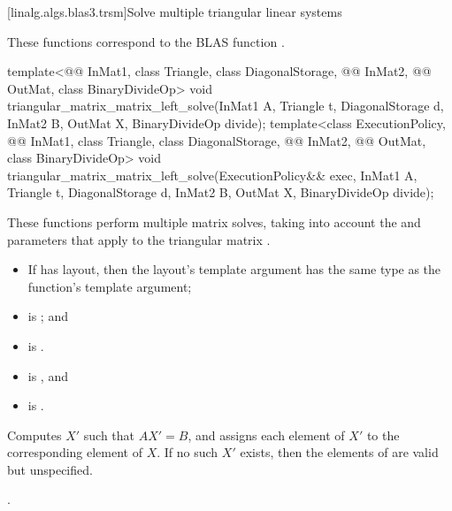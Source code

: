 [linalg.algs.blas3.trsm]{Solve multiple triangular linear systems}

\pnum
\begin{note}
These functions correspond to the BLAS function \supercite{blas3}.
\end{note}

%
\begin{itemdecl}
template<@@ InMat1, class Triangle, class DiagonalStorage,
         @@ InMat2, @@ OutMat, class BinaryDivideOp>
  void triangular_matrix_matrix_left_solve(InMat1 A, Triangle t, DiagonalStorage d,
                                           InMat2 B, OutMat X, BinaryDivideOp divide);
template<class ExecutionPolicy,
         @@ InMat1, class Triangle, class DiagonalStorage,
         @@ InMat2, @@ OutMat, class BinaryDivideOp>
  void triangular_matrix_matrix_left_solve(ExecutionPolicy&& exec,
                                           InMat1 A, Triangle t, DiagonalStorage d,
                                           InMat2 B, OutMat X, BinaryDivideOp divide);
\end{itemdecl}

\begin{itemdescr}
\pnum
These functions perform multiple matrix solves,
taking into account the  and  parameters
that apply to the triangular matrix .

\pnum
\mandates
\begin{itemize}
\item
If  has  layout, then the
      layout's  template argument has the same type as
      the function's  template argument;
\item
{}
is ; and
\item
{}
is .
\end{itemize}

\pnum
\expects
\begin{itemize}
\item
{} is , and
\item
{} is .
\end{itemize}

\pnum
\effects
Computes $X'$ such that $AX' = B$,
and assigns each element of $X'$ to the corresponding element of $X$.
If no such $X'$ exists,
then the elements of  are valid but unspecified.

\pnum
\complexity
{}.
\end{itemdescr}


